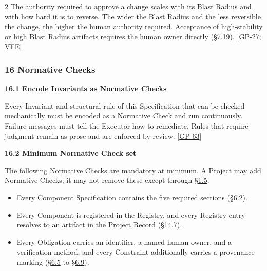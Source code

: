 \begin{multicols}{2}
The authority required to approve a change scales with its Blast Radius and with how hard it is to reverse. The wider the Blast Radius and the less reversible the change, the higher the human authority required. Acceptance of high-stability or high Blast Radius artifacts requires the human owner directly (\hyperlink{nss-7.19}{\S7.19}). [\hyperlink{gp-27}{GP-27}; \hyperlink{gp-VFE}{VFE}]

\hypertarget{nss-16}{}

\subsubsection*{16 Normative Checks}

\hypertarget{nss-16.1}{}

\par\smallskip\noindent\textbf{16.1 Encode Invariants as Normative Checks}\par\nopagebreak

Every Invariant and structural rule of this Specification that can be checked mechanically must be encoded as a Normative Check and run continuously. Failure messages must tell the Executor how to remediate. Rules that require judgment remain as prose and are enforced by review. [\hyperlink{gp-63}{GP-63}]

\hypertarget{nss-16.2}{}

\par\smallskip\noindent\textbf{16.2 Minimum Normative Check set}\par\nopagebreak

The following Normative Checks are mandatory at minimum. A Project may add Normative Checks; it may not remove these except through \hyperlink{nss-1.5}{\S1.5}.

\begin{itemize}\setlength{\itemsep}{0pt}\setlength{\parskip}{0pt}

\item Every Component Specification contains the five required sections (\hyperlink{nss-6.2}{\S6.2}).

\item Every Component is registered in the Registry, and every Registry entry resolves to an artifact in the Project Record (\hyperlink{nss-14.7}{\S14.7}).

\item Every Obligation carries an identifier, a named human owner, and a verification method; and every Constraint additionally carries a provenance marking (\hyperlink{nss-6.5}{\S6.5} to \hyperlink{nss-6.9}{\S6.9}).


\end{itemize}
\end{multicols}
